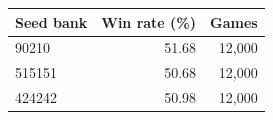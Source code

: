 \begin{tabular}{lrr}
\toprule
Seed bank & Win rate (\%) & Games \\
\midrule
90210 & 51.68 & 12,000 \\
515151 & 50.68 & 12,000 \\
424242 & 50.98 & 12,000 \\
\bottomrule
\end{tabular}
